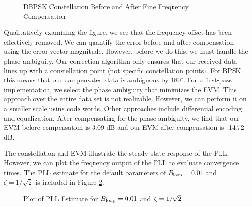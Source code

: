 \documentclass{article}
\begin{document}
\begin{figure}[H]
	\centerline{}
	\caption{DBPSK Constellation Before and After Fine Frequency Compensation}
	\label{fig::fine_freq_comp_bpsk_const}
\end{figure}

\noindent Qualitatively examining the figure, we see that the frequency offset has been effectively removed. We can quantify the error before and after compensation using the error vector magnitude. However, before we do this, we must handle the phase ambiguity. Our correction algorithm only ensures that our received data lines up with a constellation point (not specific constellation points). For BPSK this means that our compensated data is ambiguous by $180^{\circ}$. For a first-pass implementation, we select the phase ambiguity that minimizes the EVM. This approach over the entire data set is not realizable. However, we can perform it on a smaller scale using code words. Other approaches include differential encoding and equalization. After compensating for the phase ambiguity, we find that our EVM before compensation is 3.09 dB and our EVM after compensation is -14.72 dB.

  The constellation and EVM illustrate the steady state response of the PLL. However, we can plot the frequency output of the PLL to evaluate convergence times. The PLL estimate for the default parameters of $B_\text{loop} = 0.01$ and $\zeta = 1/\sqrt{2}$ is included in Figure \ref{fig::convergence_Bloop_0p01_damp_sqrt_2}.

\begin{figure}[H]
	\centerline{}
	\caption{Plot of PLL Estimate for $\protect{B_\text{loop}} = 0.01$ and $\protect{\zeta = 1/\sqrt{2}}$}
	\label{fig::convergence_Bloop_0p01_damp_sqrt_2}
\end{figure}
\end{document}
